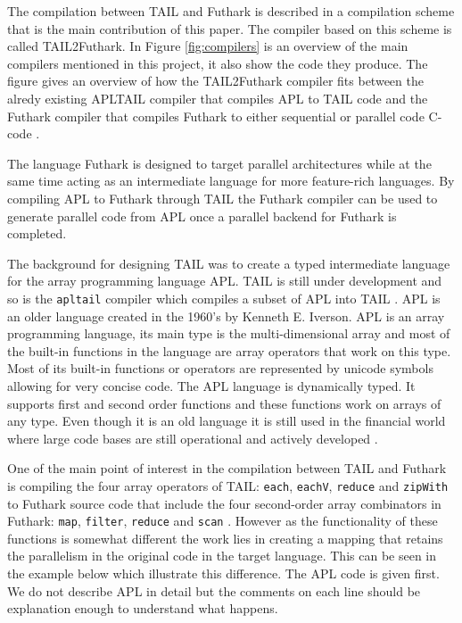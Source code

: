 \documentclass[11pt]{article}
\begin{document}
The compilation between TAIL and Futhark is described in a compilation scheme that is the main contribution of this paper.
The compiler based on this scheme is called TAIL2Futhark. 
In Figure \ref{fig:compilers} is an overview of the main compilers mentioned in this project, it also show the code they produce.
The figure gives an overview of how the TAIL2Futhark compiler fits between the alredy existing APLTAIL compiler that compiles APL to TAIL code and the Futhark compiler that compiles Futhark to either sequential or parallel code C-code \cite{TroelsHenriksen}. 

The language Futhark is designed to target parallel architectures while at the same time acting 
as an intermediate language for more feature-rich languages.
By compiling APL to Futhark through TAIL the  Futhark compiler can be used to generate parallel code from APL once a parallel backend for Futhark is completed.

The background for designing TAIL was to create a typed intermediate language for the array programming language APL.
TAIL is still under development and so is the {\tt apltail} compiler which compiles a subset of APL into
TAIL \cite{ElsmanDybdal:Array:2014}.
APL is an older language created in the 1960's by Kenneth E. Iverson.
APL is an array programming language, its main type is the multi-dimensional array 
and most of the built-in functions in the language are array operators that work on this type. 
Most of its built-in functions or operators are represented by unicode symbols allowing for very concise code.
The APL language is dynamically typed. It supports first and second order functions and these functions work on arrays of any type. 
Even though it is an old language it is still used in the financial world 
where large code bases are still operational and actively developed \cite{ElsmanDybdal:Array:2014} \cite{Array:2015}.

One of the main point of interest in the compilation between TAIL and Futhark is compiling the four array operators 
of TAIL: {\tt each}, {\tt eachV}, 
 {\tt reduce} and {\tt zipWith} to Futhark source code that include the four second-order array combinators in Futhark:  
 {\tt map}, {\tt filter}, {\tt reduce} and {\tt scan} \cite{ElsmanDybdal:Array:2014}\cite{TroelsHenriksen}. 
However as the functionality of these functions is somewhat different the work lies in creating a mapping that retains the parallelism in the original code in the target language.
This can be seen in the example below which illustrate this difference. 
The APL code is given first. We do not describe APL in detail but the comments on each line should be explanation enough to understand what happens. 
%
%
%
\end{document}
